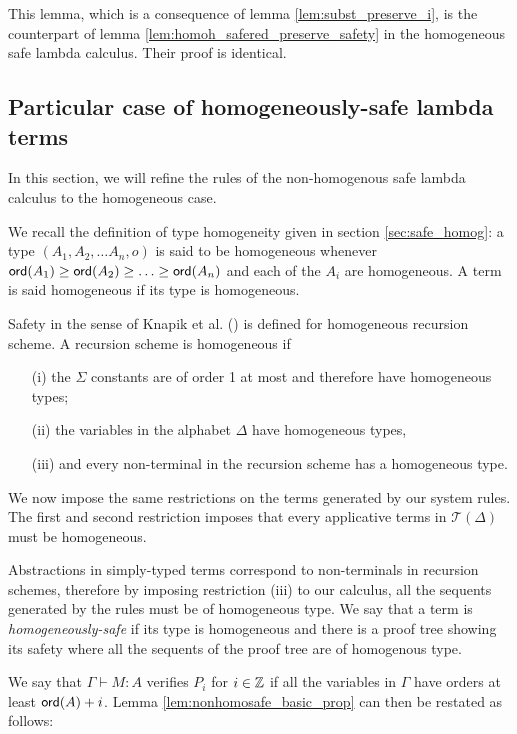 This lemma, which is a consequence of lemma
\ref{lem:subst_preserve_i}, is the counterpart of lemma
\ref{lem:homoh_safered_preserve_safety} in the homogeneous safe
lambda calculus. Their proof is identical.


\subsection{Particular case of homogeneously-safe lambda terms}

In this section, we will refine the rules of the non-homogenous safe lambda calculus to the homogeneous case.

We recall the definition of type homogeneity given in section
\ref{sec:safe_homog}: a type $(A_1, A_2, \ldots A_n, o)$ is said to
be homogeneous whenever ${\sf ord}(A_1) \geq {\sf ord}(A_2) \geq \ldots \geq
{\sf ord}(A_n)$ and each of the $A_i$ are homogeneous. A term is said
homogeneous if its type is homogeneous.

Safety in the sense of Knapik et al. (\cite{KNU02}) is defined for homogeneous recursion scheme.
A recursion scheme is homogeneous if
\begin{itemize}
    \item[(i)] the $\Sigma$ constants are of order 1 at most and therefore have homogeneous types;
    \item[(ii)] the variables in the alphabet $\Delta$ have homogeneous types,
    \item[(iii)] and every non-terminal in the recursion scheme has a homogeneous type.
\end{itemize}

We now impose the same restrictions on the terms generated by our system rules.
The first and second restriction imposes that every applicative terms in $\mathcal{T}(\Delta)$ must be homogeneous.

Abstractions in simply-typed terms correspond to non-terminals in recursion schemes,
therefore by imposing restriction (iii) to our calculus, all the sequents generated by the rules must be of homogeneous type.
We say that a term is \emph{homogeneously-safe} if its type is homogeneous
and there is a proof tree showing its safety where all the sequents
of the proof tree are of homogenous type.

We say that $\Gamma \vdash M : A$ verifies $P_i$ for $i \in \mathbb{Z}$ if all the
variables in $\Gamma$ have orders at least ${\sf ord}(A)+i$.
Lemma \ref{lem:nonhomosafe_basic_prop} can then be restated as follows:

